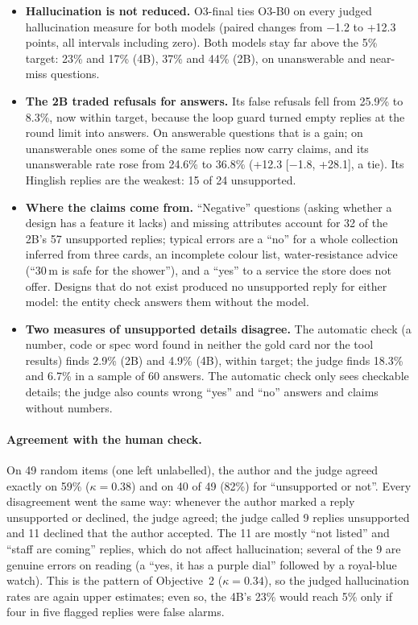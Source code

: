 \documentclass[11pt,a4paper]{article}
\begin{document}
\begin{itemize}
  \item \textbf{Hallucination is not reduced.} O3-final ties O3-B0 on every judged hallucination measure for both models
        (paired changes from $-$1.2 to +12.3 points, all intervals including zero). Both models stay far above the 5\%
        target: 23\% and 17\% (4B), 37\% and 44\% (2B), on unanswerable and near-miss questions.
  \item \textbf{The 2B traded refusals for answers.} Its false refusals fell from 25.9\% to 8.3\%, now within target,
        because the loop guard turned empty replies at the round limit into answers. On answerable questions that is a
        gain; on unanswerable ones some of the same replies now carry claims, and its unanswerable rate rose from 24.6\%
        to 36.8\% (+12.3 [$-$1.8, +28.1], a tie). Its Hinglish replies are the weakest: 15 of 24 unsupported.
  \item \textbf{Where the claims come from.} ``Negative'' questions (asking whether a design has a feature it lacks)
        and missing attributes account for 32 of the 2B's 57 unsupported replies; typical errors are a ``no'' for a
        whole collection inferred from three cards, an incomplete colour list, water-resistance advice (``30\,m is safe
        for the shower''), and a ``yes'' to a service the store does not offer. Designs that do not exist produced no
        unsupported reply for either model: the entity check answers them without the model.
  \item \textbf{Two measures of unsupported details disagree.} The automatic check (a number, code or spec word found
        in neither the gold card nor the tool results) finds 2.9\% (2B) and 4.9\% (4B), within target; the judge finds
        18.3\% and 6.7\% in a sample of 60 answers. The automatic check only sees checkable details; the judge also
        counts wrong ``yes'' and ``no'' answers and claims without numbers.
\end{itemize}

\paragraph{Agreement with the human check.} On 49 random items (one left unlabelled), the author and the judge agreed
exactly on 59\% ($\kappa = 0.38$) and on 40 of 49 (82\%) for ``unsupported or not''. Every disagreement went the same way:
whenever the author marked a reply unsupported or declined, the judge agreed; the judge called 9 replies unsupported and
11 declined that the author accepted. The 11 are mostly ``not listed'' and ``staff are coming'' replies, which do not
affect hallucination; several of the 9 are genuine errors on reading (a ``yes, it has a purple dial'' followed by a
royal-blue watch). This is the pattern of Objective~2 ($\kappa = 0.34$), so the judged hallucination rates are again
upper estimates; even so, the 4B's 23\% would reach 5\% only if four in five flagged replies were false alarms.
\end{document}
